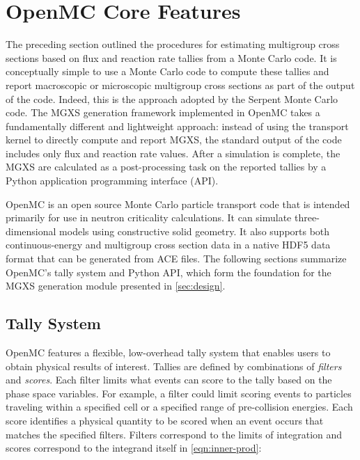 \section{OpenMC Core Features}
\label{sec:openmc}

The preceding section outlined the procedures for estimating multigroup cross sections based on flux and reaction rate tallies from a Monte Carlo code. It is conceptually simple to use a Monte Carlo code to compute these tallies and report macroscopic or microscopic multigroup cross sections as part of the output of the code. Indeed, this is the approach adopted by the Serpent Monte Carlo code\cite{leppanen2016homog}. The MGXS generation framework implemented in OpenMC takes a fundamentally different and lightweight approach: instead of using the transport kernel to directly compute and report MGXS, the standard output of the code includes only flux and reaction rate values. After a simulation is complete, the MGXS are calculated as a post-processing task on the reported tallies by a Python application programming interface (API).

OpenMC is an open source Monte Carlo particle transport code that is intended primarily for use in neutron criticality calculations. It can simulate three-dimensional models using constructive solid geometry. It also supports both continuous-energy and multigroup cross section data in a native HDF5\cite{koranne2011hdf5} data format\cite{romano2017epjwoc} that can be generated from ACE files. The following sections summarize OpenMC's tally system and Python API, which form the foundation for the MGXS generation module presented in \cref{sec:design}.

\subsection{Tally System}
\label{subsec:tallies}

OpenMC features a flexible, low-overhead tally system that enables users to obtain physical results of interest. Tallies are defined by combinations of \emph{filters} and \emph{scores}. Each filter limits what events can score to the tally based on the phase space variables. For example, a filter could limit scoring events to particles traveling within a specified cell or a specified range of pre-collision energies. Each score identifies a physical quantity to be scored when an event occurs that matches the specified filters. Filters correspond to the limits of integration and scores correspond to the integrand itself in \cref{eqn:inner-prod}:

